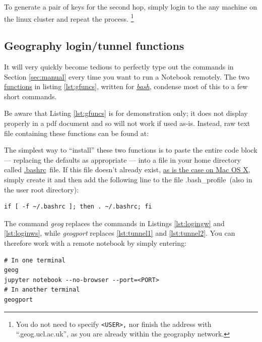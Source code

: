 \documentclass[a4paper]{article}
\begin{document}
To generate a pair of keys for the second hop, simply login to the any machine on the linux cluster and repeat the process.
\footnote{You do not need to specify \texttt{\textless{}USER\textgreater{},} nor finish the address with ``.geog.ucl.ac.uk'', as you are already within the geography network.}

\subsection{Geography login/tunnel functions}
\label{sec:gfuncs}

It will very quickly become tedious to perfectly type out the commands in Section \ref{sec:manual} every time you want to run a Notebook remotely.
The two \href{https://www.shellscript.sh/functions.html}{functions} in listing \ref{lst:gfuncs}, written for \href{http://cs.lmu.edu/~ray/notes/bash/}{\emph{bash}}, condense most of this to a few short commands.



Be aware that Listing \ref{lst:gfuncs} is for demonstration only; it does not display properly in a pdf document and so will not work if used as-is.
Instead, raw text file containing these functions can be found at:


The simplest way to ``install'' these two functions is to paste the entire code block --- replacing the defaults as appropriate --- into a file in your home directory called \href{http://superuser.com/questions/49289/what-is-the-bashrc-file}{.bashrc}~file.
If this file doesn't already exist, \href{http://apple.stackexchange.com/a/119714}{as is the case on Mac OS X}, simply create it and then add the following line to the file .bash\_profile~(also in the user root directory):

\begin{lstlisting}[caption={Source .bashrc on startup}, label={lst:srcbashrc}]
if [ -f ~/.bashrc ]; then . ~/.bashrc; fi
\end{lstlisting}

The command \emph{geog} replaces the commands in Listings \ref{lst:logingw} and \ref{lst:loginws}, while \emph{geogport} replaces \ref{lst:tunnel1} and \ref{lst:tunnel2}.
You can therefore work with a remote notebook by simply entering:
\begin{lstlisting}[caption={Set up and tunnel to remote Notebook server}, label={lst:usegfuncs}]
# In one terminal
geog
jupyter notebook --no-browser --port=<PORT>
# In another terminal
geogport
\end{lstlisting}
\end{document}
